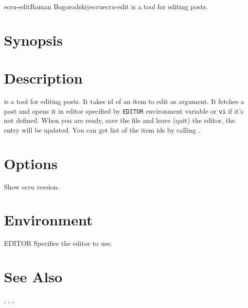 \documentclass[english]{article}
\begin{document}
\begin{Name}{1}{ecru-edit}{Roman Bogorodskiy}{ecru}{ecru-edit}
	 is a tool for editing posts.
\end{Name}

\section{Synopsis}

 

 


\section{Description}
 is a tool for editing posts. It takes id of an item to
edit as argument. It fetches a post and opens it in editor specified by
\texttt{EDITOR} environment variable or \texttt{vi} if it's not defined.
When you are ready, save the file and leave (quit) the editor, the entry
will be updated. You can get list of the item ids by calling .

\section{Options}

\begin{Description}\setlength{\itemsep}{0cm}
\item[\Opt{-v}] Show ecru version.
\end{Description}

\section{Environment}
\begin{Description}\setlength{\itemsep}{0cm}
\item[EDITOR] Specifies the editor to use.
\end{Description}

\section{See Also}

, , , 
\end{document}
